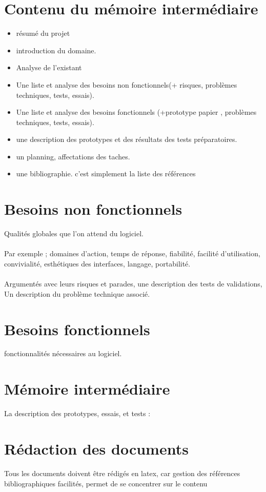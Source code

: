 \documentclass{article}
\begin{document}
\section{Contenu du mémoire intermédiaire}
\begin{itemize}
\item résumé du projet
\item introduction du domaine.
\item Analyse de l'existant
\item Une liste et analyse des besoins non fonctionnels(+ risques, problèmes techniques, tests, essais).
\item Une liste et analyse des besoins fonctionnels (+prototype papier , problèmes techniques, tests, essais).
\item une description des prototypes et des résultats des tests préparatoires.
\item un planning, affectations des taches.
\item une bibliographie. c'est simplement la liste des références
\end{itemize}
\section{Besoins non fonctionnels}Qualités globales que l'on attend du logiciel.\\\\Par exemple ; domaines d’action, temps de réponse, fiabilité, facilité d'utilisation, convivialité, esthétiques des interfaces, langage, portabilité.\\\\Argumentés avec leurs risques et parades, une description des tests de validations, Un description du problème technique associé.
\section{Besoins fonctionnels} fonctionnalités nécessaires au logiciel.
\section{Mémoire intermédiaire} La description des prototypes, essais, et tests : 
\section{Rédaction des documents} Tous les documents doivent être rédigés en latex, car gestion des références bibliographiques facilités, permet de se concentrer sur le contenu
\end{document}
